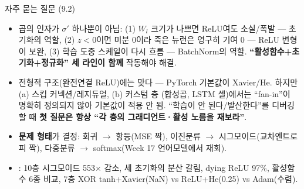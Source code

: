 \begin{frame}{자주 묻는 질문 (9.2)}
  \small
  \begin{itemize}
    \item {}
      곱의 인자가 $\sigma'$ 하나뿐이 아님: (1) $W_l$ 크기가 나쁘면
      ReLU여도 소실/폭발 — 초기화의 역할, (2) $z<0$이면 미분 0이라
      죽은 뉴런은 영구히 기여 0 — ReLU 변형이 보완, (3) 학습 도중
      스케일이 다시 흐름 — BatchNorm의 역할.
      \textbf{``활성함수+초기화+정규화'' 세 라인이 함께} 작동해야
      해결.
    \item {}
      전형적 구조(완전연결 ReLU)에는 맞다 — PyTorch 기본값이
      Xavier/He. 하지만 (a) 스킵 커넥션/레지듀얼, (b) 커스텀 층
      (합성곱, LSTM 셀)에서는 ``fan-in''이 명확히 정의되지 않아
      기본값이 적용 안 됨. ``학습이 안 된다/발산한다''를 디버깅할
      때 \textbf{첫 질문은 항상 ``각 층의 그래디언트·활성 노름을
      재보라''}.
    \item {} \textbf{문제 형태}가 결정:
      회귀 $\to$ 항등(MSE 짝), 이진분류 $\to$ 시그모이드(교차엔트로피
      짝), 다중분류 $\to$ softmax(Week 17 언어모델에서 재회).
    \item {}: 10층 시그모이드 553$\times$ 감소, 세 초기화의
      분산 갈림, dying ReLU 97\%, 활성함수 6종 비교, 7층 XOR
      tanh+Xavier(NaN) vs ReLU+He(0.25) vs Adam(수렴).
  \end{itemize}
\end{frame}
